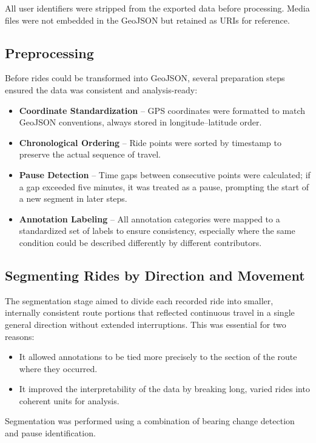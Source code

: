 All user identifiers were stripped from the exported data before processing. Media files were not embedded in the GeoJSON but retained as URIs for reference.

\subsection{Preprocessing}
Before rides could be transformed into GeoJSON, several preparation steps ensured the data was consistent and analysis-ready:

\begin{itemize}
    \item \textbf{Coordinate Standardization} – GPS coordinates were formatted to match GeoJSON conventions, always stored in longitude–latitude order.
    \item \textbf{Chronological Ordering} – Ride points were sorted by timestamp to preserve the actual sequence of travel.
    \item \textbf{Pause Detection} – Time gaps between consecutive points were calculated; if a gap exceeded five minutes, it was treated as a pause, prompting the start of a new segment in later steps.
    \item \textbf{Annotation Labeling} – All annotation categories were mapped to a standardized set of labels to ensure consistency, especially where the same condition could be described differently by different contributors.
\end{itemize}

\subsection{Segmenting Rides by Direction and Movement}
The segmentation stage aimed to divide each recorded ride into smaller, internally consistent route portions that reflected continuous travel in a single general direction without extended interruptions. This was essential for two reasons:
\begin{itemize}
    \item It allowed annotations to be tied more precisely to the section of the route where they occurred.
    \item It improved the interpretability of the data by breaking long, varied rides into coherent units for analysis.

\end{itemize}

Segmentation was performed using a combination of bearing change detection and pause identification.


